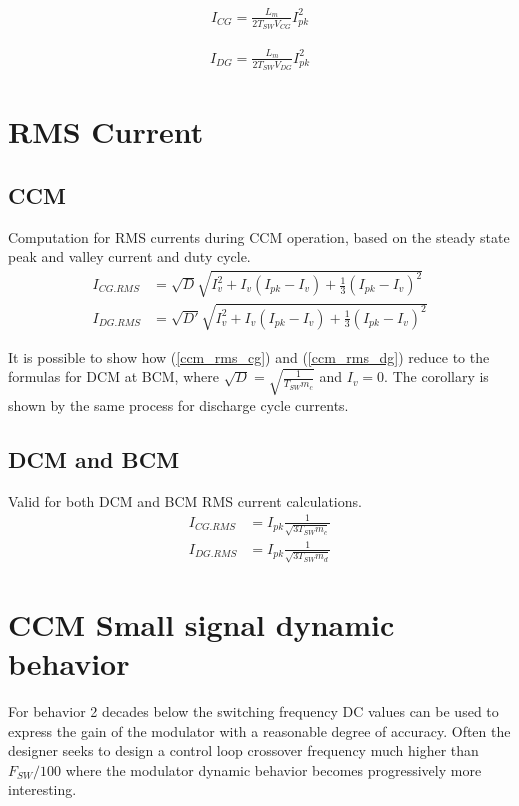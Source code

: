 \documentclass{scrartcl}
\begin{document}
		\begin{align}
		I_{CG} = \frac{L_m}{2T_{SW}V_{CG}}I_{pk}^2 \label{dcm_c2cg_ss}
		\end{align}	

		\begin{align}
		I_{DG} = \frac{L_m}{2T_{SW}V_{DG}}I_{pk}^2 \label{dcm_c2dg_ss}
		\end{align}	
	
	\section{RMS Current}
	
	\subsection{CCM}
	Computation for RMS currents during CCM operation, based on the steady state peak and valley current and duty cycle.
	\begin{align}	
		I_{CG.RMS} &= \sqrt{D}\sqrt{I_v^2 + I_v(I_{pk}-I_v) + \frac{1}{3}(I_{pk}-I_v)^2} \label{ccm_rms_cg} \\
		I_{DG.RMS} &= \sqrt{D'}\sqrt{I_v^2 + I_v(I_{pk}-I_v) + \frac{1}{3}(I_{pk}-I_v)^2} \label{ccm_rms_dg}
	\end{align}	
	
	It is possible to show how (\ref{ccm_rms_cg}) and (\ref{ccm_rms_dg}) reduce to the formulas for DCM at BCM, where $\sqrt{D} = \sqrt{\frac{1}{T_{SW}m_c}}$ and $I_v=0$.  The corollary is shown by the same process for discharge cycle currents. 
	
	\subsection{DCM and BCM}
	Valid for both DCM and BCM RMS current calculations. 
	\begin{align}	
		I_{CG.RMS} &= I_{pk} \frac{1}{\sqrt{3T_{SW}m_c}} \\
		I_{DG.RMS} &= I_{pk} \frac{1}{\sqrt{3T_{SW}m_d}} 
	\end{align}
	
	\section{CCM Small signal dynamic behavior}
	For behavior 2 decades below the switching frequency DC values can be used to express the gain of the modulator with a reasonable degree of accuracy.  Often the designer seeks to design a control loop crossover frequency much higher than $F_{SW}/100$ where the modulator dynamic behavior becomes progressively more interesting. 
	
\end{document}
